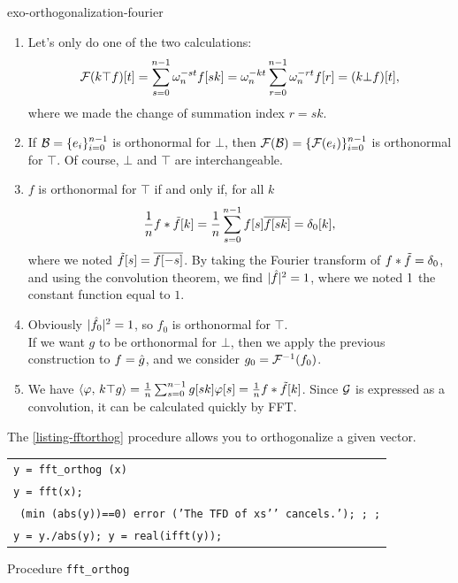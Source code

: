  
\begin{correction}{exo-orthogonalization-fourier}
\begin{enumerate}
\item Let's only do one of the two calculations:
\begin{equation*}
\mathcal{F}(k \top f) [t] = \sum_{s = 0}^{n-1}{\omega_n^{- st} f [sk]} = \omega_n^{- kt} \sum_{r = 0}^{n-1}{\omega_n^{- rt} f [r]} = (k \bot f) [t],
\end{equation*}
where we made the change of summation index $ r = sk $.
\item If $ \mathcal{B} = \{e_i\}_{i = 0}^{n-1} $ is orthonormal for $ \bot $, then $ \mathcal{F}(\mathcal{B}) = \{\mathcal{F}(e_i)\}_{i = 0}^{n-1} $ is orthonormal for $ \top $. Of course, $ \bot $ and $ \top $ are interchangeable.
\item $ f $ is orthonormal for $ \top $ if and only if, for all $ k $
\begin{equation*}
\frac{1}{n} f * \tilde{f}[k] = \frac{1}{n} \sum_{s = 0}^{n-1}{f [s] \overline{f [ sk]}} = \delta_0 [k],
\end{equation*}
where we noted $ \tilde{f}[s] = \overline{f [-s]} $. By taking the Fourier transform of $ f * \tilde{f} = \delta_0 $, and using the convolution theorem, we find $ | \hat{f} |^2 = 1 $, where we noted $ 1 $ the constant function equal to $ 1 $. \\
\item Obviously $ | \hat{f_0} |^2 = 1 $, so $ f_0 $ is orthonormal for $ \top $. \\If we want $ g $ to be orthonormal for $ \bot $, then we apply the previous construction to $ f = \hat{g} $, and we consider $ g_0 = \mathcal{F}^{-1} (f_0) $.
\item {} We have $ \langle \varphi,\,k \top g\rangle = \frac{1}{n} \sum_{s = 0}^{n-1}{g [sk] \varphi [s]} = \frac{1}{n} f * \tilde{f}[k] $. Since $ \mathcal{G} $ is expressed as a convolution, it can be calculated quickly by FFT.
\end{enumerate} The \Matlab{} \ref{listing-fftorthog} procedure allows you to orthogonalize a given vector.

\begin{listing} 
\begin{footnotesize}
{\upshape
\begin{tabular}{l} \texttt{\pfunction y = fft\_orthog (x)} \\
\texttt{y = fft(x);} \\
\texttt{\pif{} (min (abs(y))==0) error ('The TFD of xs{'}{'} cancels.'); \preturn{}; \pend{};} \\
\texttt{y = y./abs(y); y = real(ifft(y));} \\
\end{tabular}
}
\end{footnotesize}
\caption{Procedure \texttt{\upshape fft\_orthog}}
\label{listing-fftorthog}
\end{listing}
\end{correction}

